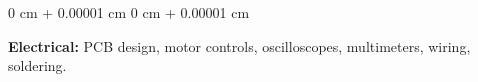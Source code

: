 \documentclass[10pt, letterpaper]{article}
\newenvironment{onecolentry}{
    \begin{adjustwidth}{
        0 cm + 0.00001 cm
    }{
        0 cm + 0.00001 cm
    }
}{
    \end{adjustwidth}
} %
\begin{document}
        \vspace{0.1 cm}

        \begin{onecolentry}
            \textbf{Electrical:} PCB design, motor controls, oscilloscopes, multimeters, wiring, soldering.
        \end{onecolentry}

\end{document}
